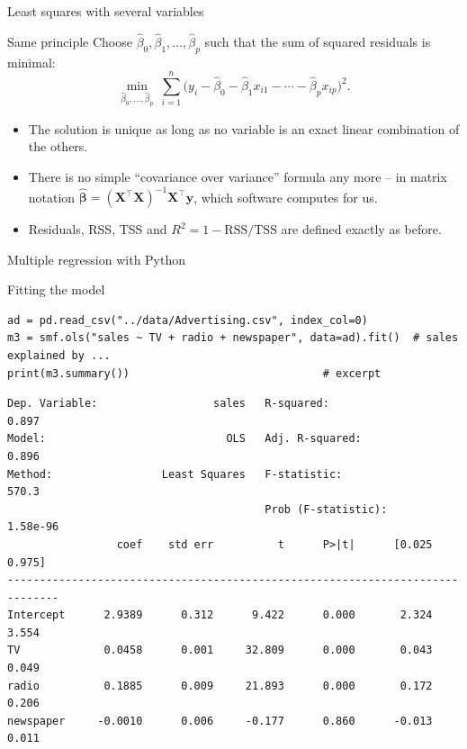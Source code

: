 \documentclass[aspectratio=169,11pt]{beamer}
\begin{document}
\begin{frame}{Least squares with several variables}
  \begin{block}{Same principle}
    Choose $\hat\beta_0,\hat\beta_1,\dots,\hat\beta_p$ such that the sum of
    squared residuals is minimal:
    \[
      \min_{\hat\beta_0,\dots,\hat\beta_p}\ \sum_{i=1}^n
      \bigl(y_i-\hat\beta_0-\hat\beta_1x_{i1}-\cdots-\hat\beta_px_{ip}\bigr)^2 .
    \]
  \end{block}
  \begin{itemize}\setlength{\itemsep}{3pt}
    \item The solution is unique as long as no variable is an exact
          linear combination of the others.
    \item There is no simple ``covariance over variance'' formula any more
          -- in matrix notation $\hat{\boldsymbol\beta}=(\mathbf X^\top\mathbf X)^{-1}\mathbf X^\top\mathbf y$,
          which software computes for us.
    \item Residuals, RSS, TSS and $R^2=1-\text{RSS}/\text{TSS}$ are defined
          exactly as before.
  \end{itemize}
\end{frame}

\begin{frame}[fragile]{Multiple regression with Python}
  \lstset{aboveskip=2pt,belowskip=2pt}
  \begin{block}{Fitting the model}
\begin{lstlisting}
ad = pd.read_csv("../data/Advertising.csv", index_col=0)
m3 = smf.ols("sales ~ TV + radio + newspaper", data=ad).fit()  # sales explained by ...
print(m3.summary())                              # excerpt
\end{lstlisting}
  \end{block}
\begin{lstlisting}[style=Pyout]
Dep. Variable:                  sales   R-squared:                       0.897
Model:                            OLS   Adj. R-squared:                  0.896
Method:                 Least Squares   F-statistic:                     570.3
                                        Prob (F-statistic):           1.58e-96
                 coef    std err          t      P>|t|      [0.025      0.975]
------------------------------------------------------------------------------
Intercept      2.9389      0.312      9.422      0.000       2.324       3.554
TV             0.0458      0.001     32.809      0.000       0.043       0.049
radio          0.1885      0.009     21.893      0.000       0.172       0.206
newspaper     -0.0010      0.006     -0.177      0.860      -0.013       0.011
\end{lstlisting}
\end{frame}
\end{document}
